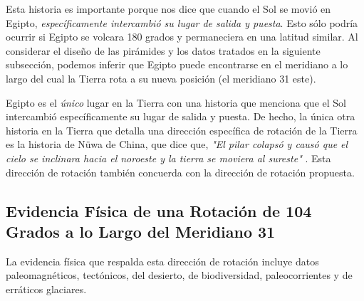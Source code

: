 \documentclass[10pt,twocolumn,letterpaper]{article}
\begin{document}
Esta historia es importante porque nos dice que cuando el Sol se movió en Egipto, \textit{específicamente intercambió su lugar de salida y puesta}. Esto sólo podría ocurrir si Egipto se volcara 180 grados y permaneciera en una latitud similar. Al considerar el diseño de las pirámides y los datos tratados en la siguiente subsección, podemos inferir que Egipto puede encontrarse en el meridiano a lo largo del cual la Tierra rota a su nueva posición (el meridiano 31 este).

Egipto es el \textit{único} lugar en la Tierra con una historia que menciona que el Sol intercambió específicamente su lugar de salida y puesta. De hecho, la única otra historia en la Tierra que detalla una dirección específica de rotación de la Tierra es la historia de Nüwa de China, que dice que, \textit{"El pilar colapsó y causó que el cielo se inclinara hacia el noroeste y la tierra se moviera al sureste"} \cite{8}. Esta dirección de rotación también concuerda con la dirección de rotación propuesta.

\subsection{Evidencia Física de una Rotación de 104 Grados a lo Largo del Meridiano 31}

La evidencia física que respalda esta dirección de rotación incluye datos paleomagnéticos, tectónicos, del desierto, de biodiversidad, paleocorrientes y de erráticos glaciares.
\end{document}

